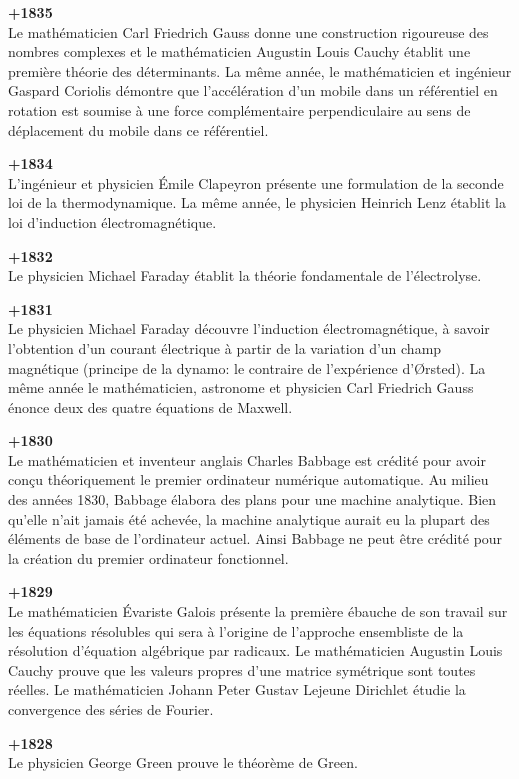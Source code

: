 \textbf{+1835}\\
Le mathématicien Carl Friedrich Gauss donne une construction rigoureuse des nombres complexes et le mathématicien Augustin Louis Cauchy établit une première théorie des déterminants. La même année, le mathématicien et ingénieur Gaspard Coriolis démontre que l'accélération d'un mobile dans un référentiel en rotation est soumise à une force complémentaire perpendiculaire au sens de déplacement du mobile dans ce référentiel.

\textbf{+1834}\\
L'ingénieur et physicien Émile Clapeyron présente une formulation de la seconde loi de la thermodynamique. La même année, le physicien Heinrich Lenz établit la loi d'induction électromagnétique.

\textbf{+1832}\\
Le physicien Michael Faraday établit la théorie fondamentale de l'électrolyse.

\textbf{+1831}\\
Le physicien Michael Faraday découvre l'induction électromagnétique, à savoir l'obtention d'un courant électrique à partir de la variation d'un champ magnétique (principe de la dynamo: le contraire de l'expérience d'Ørsted). La même année le mathématicien, astronome et physicien Carl Friedrich Gauss énonce deux des quatre équations de Maxwell.

\textbf{+1830}\\
Le mathématicien et inventeur anglais Charles Babbage est crédité pour avoir conçu théoriquement le premier ordinateur numérique automatique. Au milieu des années 1830, Babbage élabora des plans pour une machine analytique. Bien qu'elle n'ait jamais été achevée, la machine analytique aurait eu la plupart des éléments de base de l'ordinateur actuel. Ainsi Babbage ne peut être crédité pour la création du premier ordinateur fonctionnel.

\textbf{+1829}\\
Le mathématicien Évariste Galois présente la première ébauche de son travail sur les équations résolubles qui sera à l'origine de l'approche ensembliste de la résolution d'équation algébrique par radicaux. Le mathématicien Augustin Louis Cauchy prouve que les valeurs propres d'une matrice symétrique sont toutes réelles. Le mathématicien Johann Peter Gustav Lejeune Dirichlet étudie la convergence des séries de Fourier.

\textbf{+1828}\\
Le physicien George Green prouve le théorème de Green.

